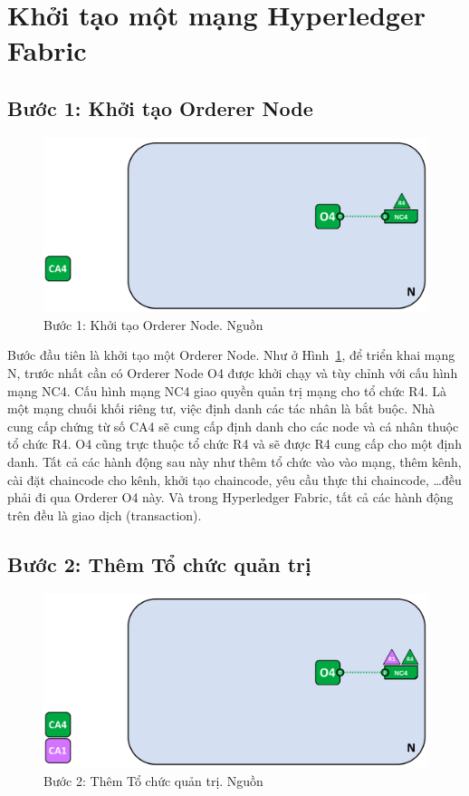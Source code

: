 \documentclass[../DoAn.tex]{subfiles}
\begin{document}
\section{Khởi tạo một mạng Hyperledger Fabric}
\subsection{Bước 1: Khởi tạo Orderer Node}

\begin{figure}[h]
  \centering
  \includegraphics[width=0.7\linewidth]{Hinhve/network.diagram.2.png}
  \caption[Bước 1: Khởi tạo Orderer Node]{Bước 1: Khởi tạo Orderer Node. Nguồn \cite{fabric_architecture}}
  \label{fig:fabric_step_1}
\end{figure}

Bước đầu tiên là khởi tạo một Orderer Node. Như ở Hình~\ref{fig:fabric_step_1}, để triển khai mạng
N, trước nhất cần có Orderer Node O4 được khởi chạy và tùy chỉnh với cấu hình
mạng NC4. Cấu hình mạng NC4 giao quyền quản trị mạng cho tổ chức R4. Là một
mạng chuối khối riêng tư, việc định danh các tác nhân là bắt buộc. Nhà cung cấp
chứng từ số CA4 sẽ cung cấp định danh cho các node và cá nhân thuộc tổ chức R4.
O4 cũng trực thuộc tổ chức R4 và sẽ được R4 cung cấp cho một định danh. Tất cả
các hành động sau này như thêm tổ chức vào vào mạng, thêm kênh, cài đặt
chaincode cho kênh, khởi tạo chaincode, yêu cầu thực thi chaincode, \dots đều phải
đi qua Orderer O4 này. Và trong Hyperledger Fabric, tất cả các hành động trên
đều là giao dịch (transaction).

\subsection{Bước 2: Thêm Tổ chức quản trị}

\begin{figure}[h]
  \centering
  \includegraphics[width=0.7\linewidth]{Hinhve/network.diagram.2.1.png}
  \caption[Bước 2: Thêm Tổ chức quản trị]{Bước 2: Thêm Tổ chức quản trị. Nguồn \cite{fabric_architecture}}
  \label{fig:fabric_step_2}
\end{figure}
\end{document}
